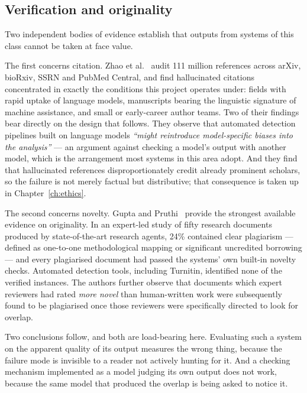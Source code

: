\subsection{Verification and originality}

Two independent bodies of evidence establish that outputs from systems of this class cannot
be taken at face value.

The first concerns citation. Zhao et al.~\cite{zhao2026hallucinations} audit 111 million
references across arXiv, bioRxiv, SSRN and PubMed Central, and find hallucinated citations
concentrated in exactly the conditions this project operates under: fields with rapid uptake
of language models, manuscripts bearing the linguistic signature of machine assistance, and
small or early-career author teams. Two of their findings bear directly on the design that
follows. They observe that automated detection pipelines built on language models
\emph{``might reintroduce model-specific biases into the analysis''} --- an argument against
checking a model's output with another model, which is the arrangement most systems in this
area adopt. And they find that hallucinated references disproportionately credit already
prominent scholars, so the failure is not merely factual but distributive; that consequence is
taken up in Chapter~\ref{ch:ethics}.

The second concerns novelty. Gupta and Pruthi~\cite{gupta2025glitters} provide the strongest
available evidence on originality. In an expert-led study of
fifty research documents produced by state-of-the-art research agents, 24\% contained clear
plagiarism --- defined as one-to-one methodological mapping or significant uncredited
borrowing --- and every plagiarised document had passed the systems' own built-in novelty
checks. Automated detection tools, including Turnitin, identified none of the verified
instances. The authors further observe that documents which expert reviewers had rated
\emph{more novel} than human-written work were subsequently found to be plagiarised once those
reviewers were specifically directed to look for overlap.

Two conclusions follow, and both are load-bearing here. Evaluating such a system on the
apparent quality of its output measures the wrong thing, because the failure mode is
invisible to a reader not actively hunting for it. And a checking mechanism implemented as a
model judging its own output does not work, because the same model that produced the
overlap is being asked to notice it.

